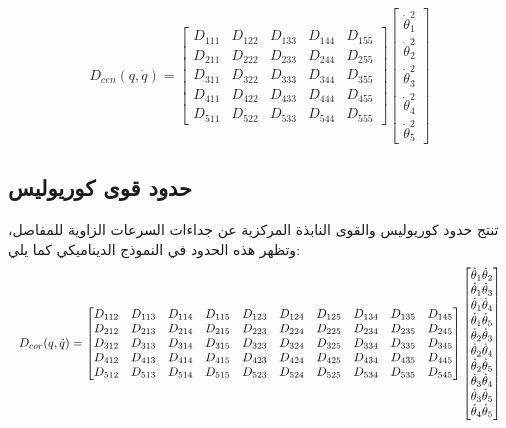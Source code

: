 \begin{equation}
D_{cen}(q,\dot{q}) =
\begin{bmatrix}
D_{111} & D_{122} & D_{133} & D_{144} & D_{155} \\
D_{211} & D_{222} & D_{233} & D_{244} & D_{255} \\
D_{311} & D_{322} & D_{333} & D_{344} & D_{355} \\
D_{411} & D_{422} & D_{433} & D_{444} & D_{455} \\
D_{511} & D_{522} & D_{533} & D_{544} & D_{555}
\end{bmatrix}
\begin{bmatrix}
\dot{\theta}_1^2 \\
\dot{\theta}_2^2 \\
\dot{\theta}_3^2 \\
\dot{\theta}_4^2 \\
\dot{\theta}_5^2
\end{bmatrix}
\end{equation}

\subsection*{حدود قوى كوريوليس}

تنتج حدود كوريوليس والقوى النابذة المركزية عن جداءات السرعات الزاوية للمفاصل، وتظهر هذه الحدود في النموذج الديناميكي كما يلي:
\begin{equation*}
\resizebox{\textwidth}{!}{$
D_{cor}(q,\dot{q}) =
\begin{bmatrix}
D_{112} & D_{113} & D_{114} & D_{115} & D_{123} & D_{124} & D_{125} & D_{134} & D_{135} & D_{145} \\
D_{212} & D_{213} & D_{214} & D_{215} & D_{223} & D_{224} & D_{225} & D_{234} & D_{235} & D_{245} \\
D_{312} & D_{313} & D_{314} & D_{315} & D_{323} & D_{324} & D_{325} & D_{334} & D_{335} & D_{345} \\
D_{412} & D_{413} & D_{414} & D_{415} & D_{423} & D_{424} & D_{425} & D_{434} & D_{435} & D_{445} \\
D_{512} & D_{513} & D_{514} & D_{515} & D_{523} & D_{524} & D_{525} & D_{534} & D_{535} & D_{545}
\end{bmatrix}
\begin{bmatrix}
\dot{\theta}_1\dot{\theta}_2 \\
\dot{\theta}_1\dot{\theta}_3 \\
\dot{\theta}_1\dot{\theta}_4 \\
\dot{\theta}_1\dot{\theta}_5 \\
\dot{\theta}_2\dot{\theta}_3 \\
\dot{\theta}_2\dot{\theta}_4 \\
\dot{\theta}_2\dot{\theta}_5 \\
\dot{\theta}_3\dot{\theta}_4 \\
\dot{\theta}_3\dot{\theta}_5 \\
\dot{\theta}_4\dot{\theta}_5
\end{bmatrix}
$}
\end{equation*}

